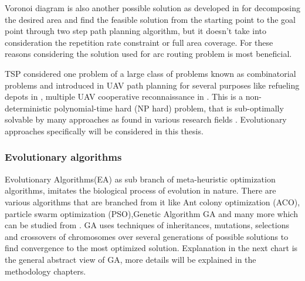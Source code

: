 Voronoi diagram is also another possible solution as developed in \cite{voronoi_UAV} for decomposing the desired area and find the feasible solution from the starting point to the goal point through two step path planning algorithm, but it doesn't take into consideration the repetition rate constraint or full area coverage. For these reasons considering the solution used for arc routing problem is most beneficial.

TSP considered one problem of a large class of problems known as combinatorial problems and introduced in UAV path planning for several purposes like refueling depots in \cite{TSP_UAV}, multiple UAV cooperative reconnaissance in \cite{TSP_UAV_Multi}. This is a non-deterministic polynomial-time hard (NP hard) problem, that is sub-optimally solvable by many approaches as found in various research fields \cite{TSP_NPHARD}. Evolutionary approaches specifically  will be considered in this thesis.  

\subsubsection*{Evolutionary algorithms}


Evolutionary Algorithms(EA) as sub branch of meta-heuristic optimization algorithms, imitates the biological process of evolution in nature. There are various algorithms that are branched from it like Ant colony optimization (ACO), particle swarm optimization (PSO),Genetic Algorithm GA and many more which can be studied from \cite{Evo_Book1,Evo_Book2}. GA uses techniques of inheritances, mutations, selections and crossovers of chromosomes over several generations of possible solutions to find convergence to the most optimized solution. Explanation in the next chart is the general abstract view of GA, more details will be explained in the methodology chapters.


